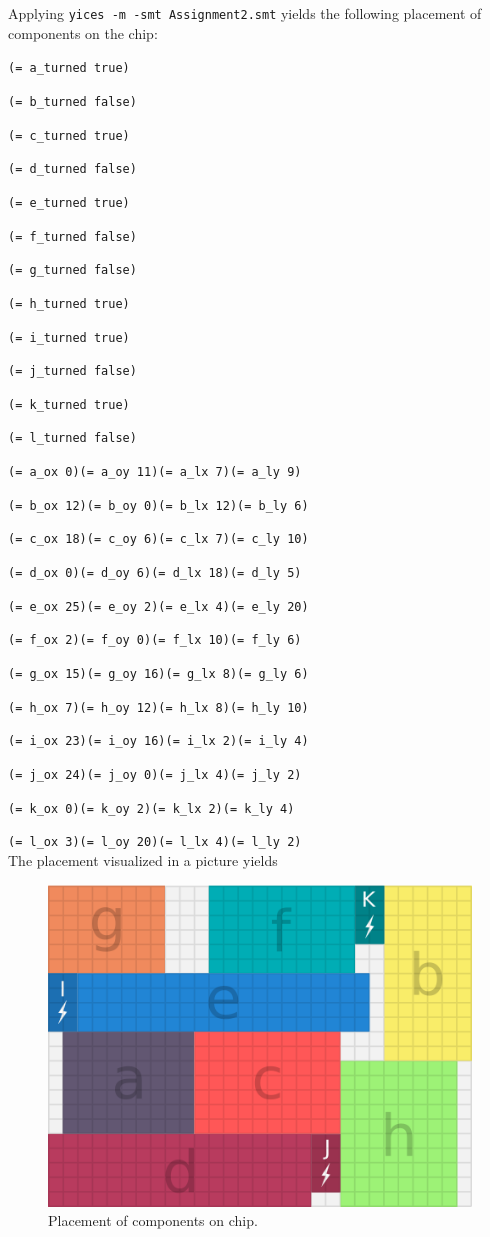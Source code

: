\documentclass[a4paper]{article}
\begin{document}
	Applying {\tt yices -m -smt Assignment2.smt} yields the following placement of components on the chip:
	
	{\tt (= a\_turned true)}
	
	{\tt (= b\_turned false)}
	
	{\tt (= c\_turned true)}
	
	{\tt (= d\_turned false)}
	
	{\tt (= e\_turned true)}
	
	{\tt (= f\_turned false)}
	
	{\tt (= g\_turned false)}
	
	{\tt (= h\_turned true)}
	
	{\tt (= i\_turned true)}
	
	{\tt (= j\_turned false)}
	
	{\tt (= k\_turned true)}
	
	{\tt (= l\_turned false)}
	
	{\tt (= a\_ox 0)(= a\_oy 11)(= a\_lx 7)(= a\_ly 9)}
	
	{\tt (= b\_ox 12)(= b\_oy 0)(= b\_lx 12)(= b\_ly 6)}
	
	{\tt (= c\_ox 18)(= c\_oy 6)(= c\_lx 7)(= c\_ly 10)}
	
	{\tt (= d\_ox 0)(= d\_oy 6)(= d\_lx 18)(= d\_ly 5)}
	
	{\tt (= e\_ox 25)(= e\_oy 2)(= e\_lx 4)(= e\_ly 20)}
	
	{\tt (= f\_ox 2)(= f\_oy 0)(= f\_lx 10)(= f\_ly 6)}
	
	{\tt (= g\_ox 15)(= g\_oy 16)(= g\_lx 8)(= g\_ly 6)}
	
	{\tt (= h\_ox 7)(= h\_oy 12)(= h\_lx 8)(= h\_ly 10)}
	
	{\tt (= i\_ox 23)(= i\_oy 16)(= i\_lx 2)(= i\_ly 4)}
	
	{\tt (= j\_ox 24)(= j\_oy 0)(= j\_lx 4)(= j\_ly 2)}
	
	{\tt (= k\_ox 0)(= k\_oy 2)(= k\_lx 2)(= k\_ly 4)}
	
	{\tt (= l\_ox 3)(= l\_oy 20)(= l\_lx 4)(= l\_ly 2)}\\
	
	The placement visualized in a picture yields
	\begin{figure}[H]
		\centering
		\includegraphics[scale=0.7]{power-grid-3.png}
		\caption{Placement of components on chip.}
	\end{figure}
	
\end{document}
